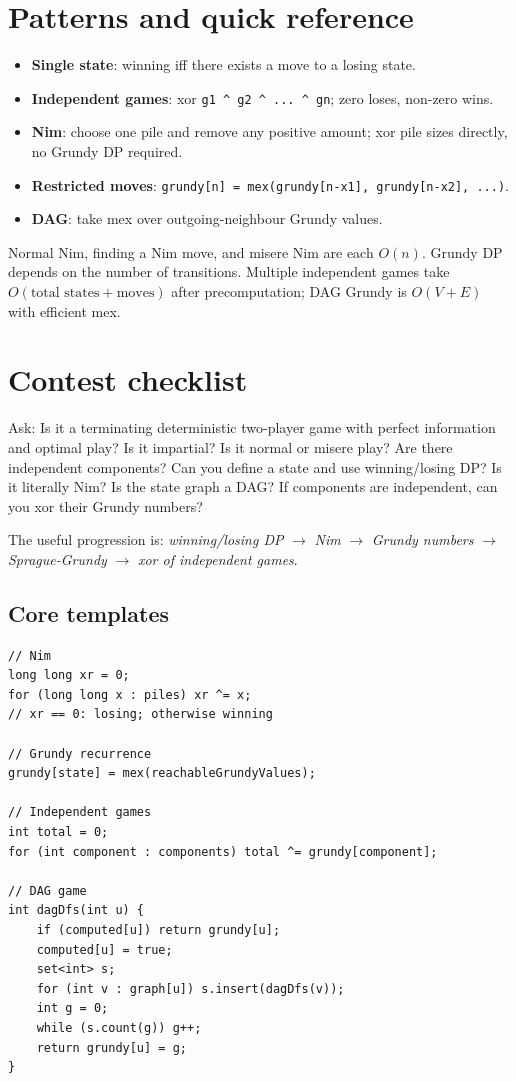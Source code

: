 \section{Patterns and quick reference}

\begin{itemize}
\item \textbf{Single state}: winning iff there exists a move to a losing state.
\item \textbf{Independent games}: xor \texttt{g1 \^{} g2 \^{} ... \^{} gn}; zero loses, non-zero wins.
\item \textbf{Nim}: choose one pile and remove any positive amount; xor pile sizes directly, no Grundy DP required.
\item \textbf{Restricted moves}: \texttt{grundy[n] = mex(grundy[n-x1], grundy[n-x2], ...)}.
\item \textbf{DAG}: take mex over outgoing-neighbour Grundy values.
\end{itemize}

Normal Nim, finding a Nim move, and misere Nim are each $O(n)$. Grundy DP depends on the number of transitions. Multiple independent games take $O(\text{total states} + \text{moves})$ after precomputation; DAG Grundy is $O(V+E)$ with efficient mex.

\section{Contest checklist}

Ask: Is it a terminating deterministic two-player game with perfect information and optimal play? Is it impartial? Is it normal or misere play? Are there independent components? Can you define a state and use winning/losing DP? Is it literally Nim? Is the state graph a DAG? If components are independent, can you xor their Grundy numbers?

The useful progression is: \emph{winning/losing DP} $\rightarrow$ \emph{Nim} $\rightarrow$ \emph{Grundy numbers} $\rightarrow$ \emph{Sprague-Grundy} $\rightarrow$ \emph{xor of independent games}.

\subsection{Core templates}
\begin{lstlisting}
// Nim
long long xr = 0;
for (long long x : piles) xr ^= x;
// xr == 0: losing; otherwise winning

// Grundy recurrence
grundy[state] = mex(reachableGrundyValues);

// Independent games
int total = 0;
for (int component : components) total ^= grundy[component];

// DAG game
int dagDfs(int u) {
    if (computed[u]) return grundy[u];
    computed[u] = true;
    set<int> s;
    for (int v : graph[u]) s.insert(dagDfs(v));
    int g = 0;
    while (s.count(g)) g++;
    return grundy[u] = g;
}
\end{lstlisting}
